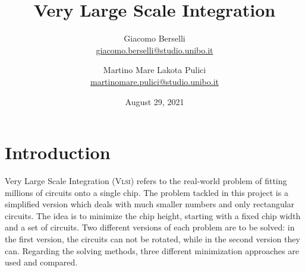 \documentclass[a4paper, 12pt]{article}
\begin{document}
\title{Very Large Scale Integration}
\author{Giacomo Berselli \\ \small{\href{mailto:giacomo.berselli@studio.unibo.it}{giacomo.berselli@studio.unibo.it}} \and
Martino Mare Lakota Pulici \\ \small{\href{mailto:martinomare.pulici@studio.unibo.it}{martinomare.pulici@studio.unibo.it}}}
\date{August 29, 2021}
\maketitle
\begin{center}
\end{center}


\clearpage


\tableofcontents


\clearpage


\listoffigures


\clearpage


\section{Introduction}

Very Large Scale Integration (\textsc{Vlsi}) refers to the real-world problem of fitting millions of circuits onto a single chip. The problem tackled in this project is a simplified version which deals with much smaller numbers and only rectangular circuits. The idea is to minimize the chip height, starting with a fixed chip width and a set of circuits. Two different versions of each problem are to be solved: in the first version, the circuits can not be rotated, while in the second version they can. Regarding the solving methods, three different minimization approaches are used and compared.
\end{document}
